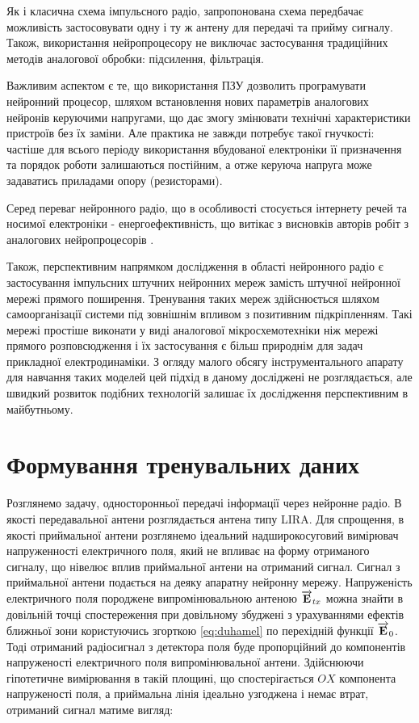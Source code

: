 Як і класична схема імпульсного радіо, запропонована схема передбачає 
можливість застосовувати одну і ту ж антену для передачі та прийму сигналу. 
Також, використання нейропроцесору не виключає застосування традиційних 
методів аналогової обробки: підсилення, фільтрація.

Важливим аспектом є те, що використання ПЗУ дозволить програмувати нейронний 
процесор, шляхом встановлення нових параметрів аналогових нейронів керуючими 
напругами, що дає змогу змінювати технічні характеристики пристроїв без 
їх заміни. Але практика не завжди потребує такої гнучкості: частіше для всього 
періоду використання вбудованої електроніки її призначення та порядок роботи 
залишаються постійним, а отже керуюча напруга може задаватись приладами опору
(резисторами).

Серед переваг нейронного радіо, що в особливості стосується інтернету речей 
та носимої електроніки - енергоефективність, що витікає з висновків авторів 
робіт з аналогових нейропроцесорів \cite{imp:AnalogLSTM}.

Також, перспективним напрямком дослідження в області нейронного радіо є 
застосування імпульсних штучних нейронних мереж замість штучної нейронної 
мережі прямого поширення. Тренування таких мереж здійснюється шляхом 
самоорганізації системи під зовнішнім впливом з позитивним підкріпленням. 
Такі мережі простіше виконати у виді аналогової мікросхемотехніки ніж мережі
прямого розповсюдження і їх застосування є більш природнім для задач 
прикладної електродинаміки. З огляду малого обсягу інструментального 
апарату для навчання таких моделей цей підхід в даному досліджені не 
розглядається, але швидкий розвиток подібних технологій залишає їх 
дослідження перспективним в майбутньому.

\section{Формування тренувальних даних}

Розглянемо задачу, односторонньої передачі інформації через нейронне радіо. 
В якості передавальної антени розглядається антена типу LIRA. Для спрощення, 
в якості приймальної антени розглянемо ідеальний надширокосуговий вимірювач 
напруженності електричного поля, який не впливає на форму отриманого сигналу,
що нівелює вплив приймальної антени на отриманий сигнал. Сигнал з приймальної 
антени подається на деяку апаратну нейронну мережу. Напруженість електричного 
поля породжене випромінювальною антеною $ \overrightarrow{\mathbf E}_{tx} $ можна знайти в 
довільній точці спостереження при довільному збуджені з урахуваннями ефектів 
ближньої зони користуючись згорткою \eqref{eq:duhamel} по перехідній функції 
$ \overrightarrow{\mathbf E}_0 $. Тоді отриманий радіосигнал з детектора поля буде пропорційний 
до компонентів напруженості електричного поля випромінювальної антени. 
Здійснюючи гіпотетичне вимірювання в такій площині, що спостерігається $ OX $ 
компонента напруженості поля, а приймальна лінія ідеально узгоджена і немає 
втрат, отриманий сигнал матиме вигляд:

